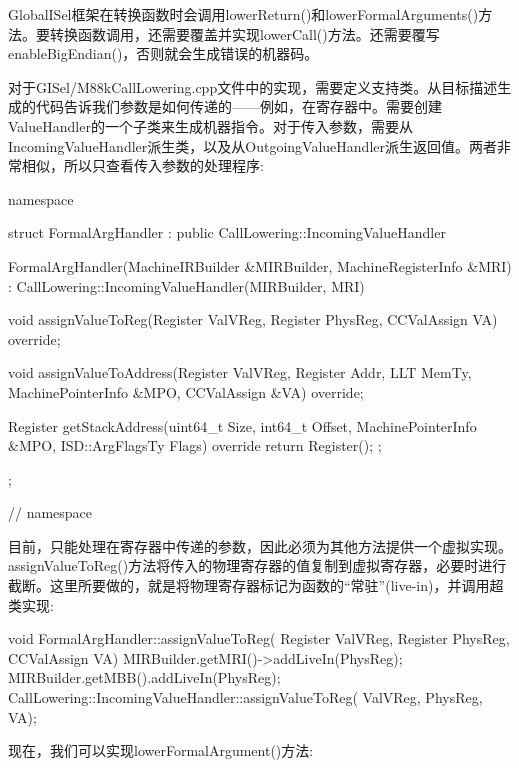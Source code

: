 GlobalISel框架在转换函数时会调用lowerReturn()和lowerFormalArguments()方法。要转换函数调用，还需要覆盖并实现lowerCall()方法。还需要覆写enableBigEndian()，否则就会生成错误的机器码。

对于GISel/M88kCallLowering.cpp文件中的实现，需要定义支持类。从目标描述生成的代码告诉我们参数是如何传递的——例如，在寄存器中。需要创建ValueHandler的一个子类来生成机器指令。对于传入参数，需要从IncomingValueHandler派生类，以及从OutgoingValueHandler派生返回值。两者非常相似，所以只查看传入参数的处理程序:

\begin{cpp}
namespace {
struct FormalArgHandler
        : public CallLowering::IncomingValueHandler {
    FormalArgHandler(MachineIRBuilder &MIRBuilder,
                     MachineRegisterInfo &MRI)
        : CallLowering::IncomingValueHandler(MIRBuilder,
                                             MRI) {}

    void assignValueToReg(Register ValVReg,
                          Register PhysReg,
                          CCValAssign VA) override;

    void assignValueToAddress(Register ValVReg,
                              Register Addr, LLT MemTy,
                              MachinePointerInfo &MPO,
                              CCValAssign &VA) override{};

    Register
    getStackAddress(uint64_t Size, int64_t Offset,
                    MachinePointerInfo &MPO,
                    ISD::ArgFlagsTy Flags) override {
        return Register();
    };
};
} // namespace
\end{cpp}

目前，只能处理在寄存器中传递的参数，因此必须为其他方法提供一个虚拟实现。assignValueToReg()方法将传入的物理寄存器的值复制到虚拟寄存器，必要时进行截断。这里所要做的，就是将物理寄存器标记为函数的“常驻”(live-in)，并调用超类实现:

\begin{cpp}
void FormalArgHandler::assignValueToReg(
        Register ValVReg, Register PhysReg,
        CCValAssign VA) {
    MIRBuilder.getMRI()->addLiveIn(PhysReg);
    MIRBuilder.getMBB().addLiveIn(PhysReg);
    CallLowering::IncomingValueHandler::assignValueToReg(
        ValVReg, PhysReg, VA);
}
\end{cpp}

现在，我们可以实现lowerFormalArgument()方法:

